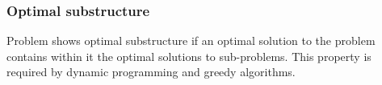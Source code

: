 \documentclass[10pt,a4paper]{article}
\begin{document}
\subsubsection{Optimal substructure}

Problem shows optimal substructure if an optimal solution to the problem contains within it the
optimal solutions to sub-problems. This property is required by dynamic programming and greedy
algorithms. \par 

\end{document}
